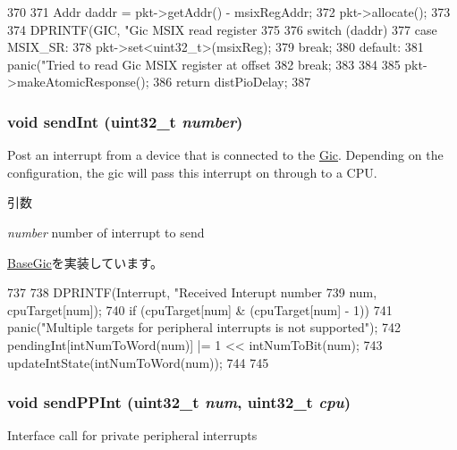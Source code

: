 \begin{DoxyCode}
370 {
371     Addr daddr = pkt->getAddr() - msixRegAddr;
372     pkt->allocate();
373 
374     DPRINTF(GIC, "Gic MSIX read register %
375 
376     switch (daddr) {
377         case MSIX_SR:
378             pkt->set<uint32_t>(msixReg);
379             break;
380         default:
381             panic("Tried to read Gic MSIX register at offset %
382             break;
383     }
384 
385     pkt->makeAtomicResponse();
386     return distPioDelay;
387 }
\end{DoxyCode}
\hypertarget{classPl390_afbcaff37cd3cabac35c8fa0154de991f}{
\subsubsection[{sendInt}]{\setlength{\rightskip}{0pt plus 5cm}void sendInt ({\bf uint32\_\-t} {\em number})}}
\label{classPl390_afbcaff37cd3cabac35c8fa0154de991f}
Post an interrupt from a device that is connected to the \hyperlink{namespaceGic}{Gic}. Depending on the configuration, the gic will pass this interrupt on through to a CPU. 
\begin{DoxyParams}{引数}
\item[{\em number}]number of interrupt to send \end{DoxyParams}


\hyperlink{classBaseGic_ad6b2cb6b9a108c3852cb5a88126e5320}{BaseGic}を実装しています。


\begin{DoxyCode}
737 {
738     DPRINTF(Interrupt, "Received Interupt number %
739             num, cpuTarget[num]);
740     if (cpuTarget[num] & (cpuTarget[num] - 1))
741         panic("Multiple targets for peripheral interrupts is not supported\n");
742     pendingInt[intNumToWord(num)] |= 1 << intNumToBit(num);
743     updateIntState(intNumToWord(num));
744 
745 }
\end{DoxyCode}
\hypertarget{classPl390_a4780a1058316daff7b2c8f980c681101}{
\subsubsection[{sendPPInt}]{\setlength{\rightskip}{0pt plus 5cm}void sendPPInt ({\bf uint32\_\-t} {\em num}, \/  {\bf uint32\_\-t} {\em cpu})}}
\label{classPl390_a4780a1058316daff7b2c8f980c681101}
Interface call for private peripheral interrupts 


